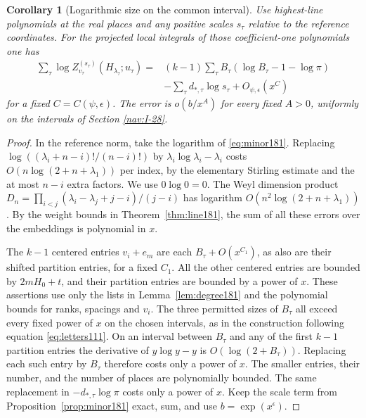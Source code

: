 \documentclass[a4paper,11pt]{article}
\newtheorem{corollary}[proposition]{Corollary}
\theoremstyle{definition}
\theoremstyle{remark}
\numberwithin{equation}{section}
\begin{document}
\begin{corollary}[Logarithmic size on the common interval]
\label{cor:asym181}
Use highest-line polynomials at the real places and any
positive scales \(s_\tau\) relative to the reference coordinates.
For the projected local integrals of those coefficient-one
polynomials one has
\begin{align*}
 \sum_\tau\log Z_{v_\tau}^{(s_\tau)}(H_{\lambda_\tau};u_\tau)
     ={}&(k-1)\sum_\tau B_\tau
                     (\log B_\tau-1-\log\pi)\\
        &-\sum_\tau d_{*,\tau}\log s_\tau
            + O_{\psi,\epsilon}(x^C)
\end{align*}
for a fixed \(C=C(\psi,\epsilon)\). The error is
\(o(b/x^A)\) for every fixed \(A>0\), uniformly on the
intervals of Section \ref{nav:I-28}.
\end{corollary}
\begin{proof}
In the reference norm, take the logarithm of
\eqref{eq:minor181}. Replacing
\(\log((\lambda_i+n-i)!/(n-i)!)\) by
\(\lambda_i\log\lambda_i-\lambda_i\) costs
\(O(n\log(2+n+\lambda_1))\) per index, by the elementary
Stirling estimate and the at most \(n-i\) extra factors.
We use \(0\log0=0\). The Weyl dimension product
\(D_n=\prod_{i<j}(\lambda_i-\lambda_j+j-i)/(j-i)\)
has logarithm \(O(n^2\log(2+n+\lambda_1))\).
By the weight bounds in Theorem~\ref{thm:line181}, the sum
of all these errors over the embeddings is polynomial in \(x\).

The \(k-1\) centered entries \(v_i+e_m\) are each
\(B_\tau+O(x^{C_1})\), as also are their shifted partition
entries, for a fixed \(C_1\). All the other centered
entries are bounded by \(2mH_0+t\), and their partition
entries are bounded by a power of \(x\). These assertions
use only the lists in Lemma~\ref{lem:degree181} and the
polynomial bounds for ranks, spacings and \(v_i\).
The three permitted sizes of \(B_\tau\) all exceed every
fixed power of \(x\) on the chosen intervals, as in
the construction following equation \ref{eq:letters111}. On an interval
between \(B_\tau\) and any of the first \(k-1\) partition
entries the derivative of \(y\log y-y\) is
\(O(\log(2+B_\tau))\). Replacing each such entry by
\(B_\tau\) therefore costs only a power of \(x\).
The smaller entries, their number, and the number of
places are polynomially bounded. The same replacement
in \(-d_{*,\tau}\log\pi\) costs only a power of \(x\).
Keep the scale term from Proposition~\ref{prop:minor181}
exact, sum, and use \(b=\exp(x^\epsilon)\).
\end{proof}
\end{document}
